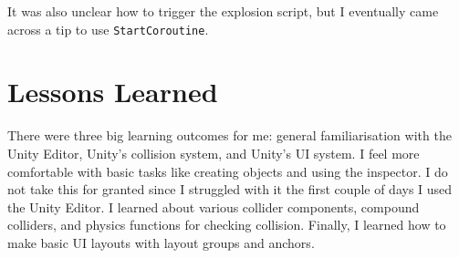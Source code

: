 \documentclass[a4paper, 12pt]{scrartcl}
\begin{document}
It was also unclear how to trigger the explosion script, but I eventually came across a tip to use \texttt{StartCoroutine}.

\section{Lessons Learned}
There were three big learning outcomes for me: general familiarisation with the Unity Editor, Unity's collision system, and Unity's UI system. I feel more comfortable with basic tasks like creating objects and using the inspector. I do not take this for granted since I struggled with it the first couple of days I used the Unity Editor. I learned about various collider components, compound colliders, and physics functions for checking collision. Finally, I learned how to make basic UI layouts with layout groups and anchors.
\end{document}
